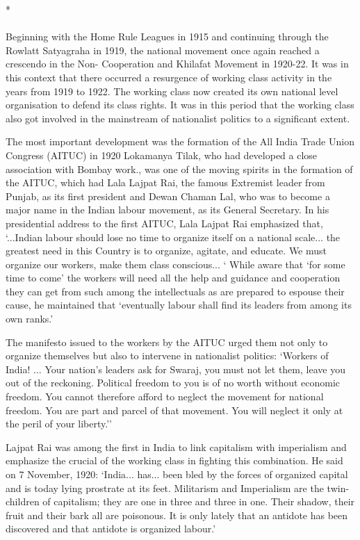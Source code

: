 \begin{center}*\end{center}

\paragraph*{}


Beginning with the Home Rule Leagues in 1915 and continuing through the Rowlatt Satyagraha in 1919, the national movement once again reached a crescendo in the Non- Cooperation and Khilafat Movement in 1920-22. It was in this context that there occurred a resurgence of working class activity in the years from 1919 to 1922. The working class now created its own national level organisation to defend its class rights. It was in this period that the working class also got involved in the mainstream of nationalist politics to a significant extent.

The most important development was the formation of the All India Trade Union Congress (AITUC) in 1920 Lokamanya Tilak, who had developed a close association with Bombay work., was one of the moving spirits in the formation of the AITUC, which had Lala Lajpat Rai, the famous Extremist leader from Punjab, as its first president and Dewan Chaman Lal, who was to become a major name in the Indian labour movement, as its General Secretary. In his presidential address to the first AITUC, Lala Lajpat Rai emphasized that, `...Indian labour should lose no time to organize itself on a national scale... the greatest need in this Country is to organize, agitate, and educate. We must organize our workers, make them class conscious... ` While aware that `for some time to come' the workers will need all the help and guidance and cooperation they can get from such among the intellectuals as are prepared to espouse their cause, he maintained that `eventually labour shall find its leaders from among its own ranks.'

The manifesto issued to the workers by the AITUC urged them not only to organize themselves but also to intervene in nationalist politics: `Workers of India! ... Your nation's leaders ask for Swaraj, you must not let them, leave you out of the reckoning. Political freedom to you is of no worth without economic freedom. You cannot therefore afford to neglect the movement for national freedom. You are part and parcel of that movement. You will neglect it only at the peril of your liberty.''

Lajpat Rai was among the first in India to link capitalism with imperialism and emphasize the crucial of the working class in fighting this combination. He said on 7 November, 1920: `India... has... been bled by the forces of organized capital and is today lying prostrate at its feet. Militarism and Imperialism are the twin-children of capitalism; they are one in three and three in one. Their shadow, their fruit and their bark all are poisonous. It is only lately that an antidote has been discovered and that antidote is organized labour.'

